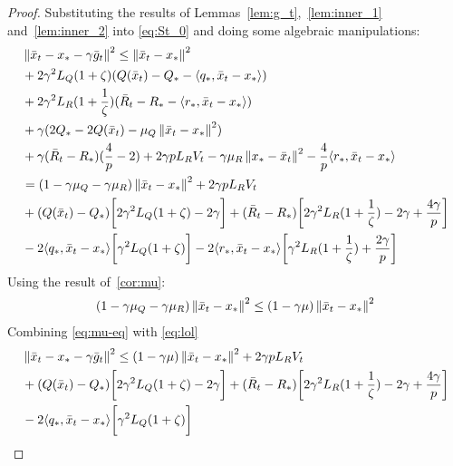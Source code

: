 \begin{proof} Substituting the results of Lemmas~\ref{lem:g_t},~\ref{lem:inner_1} and~\ref{lem:inner_2} into \eqref{eq:St_0} and doing some algebraic manipulations:
    \begin{align}
        \begin{split}
            &\left\|\bar{x}_t - x_* - \gamma \bar{g}_t\right\|^2 \leq \left\|\bar{x}_t - x_*\right\|^2 \\
            &+ 2\gamma^2 L_Q (1 + \zeta) (Q(\bar{x}_t) - Q_* - \langle q_*, \bar{x}_t - x_*\rangle) \\
            &+ 2\gamma^2 L_R (1 + \frac{1}{\zeta}) (\bar{R}_t - R_* - \langle r_*, \bar{x}_t - x_*\rangle) \\
            &+ \gamma ( 2 Q_* - 2 Q(\bar{x}_t) - \mu_Q \left\|\bar{x}_t - x_*\right\|^2 ) \\
            &+ \gamma(\bar{R}_t - R_*)(\frac{4}{p} - 2) + 2 \gamma p L_R V_t - \gamma \mu_R \left\|x_* - \bar{x}_t\right\|^2 - \frac{4}{p}\langle r_*, \bar{x}_t - x_*\rangle\\
            &= (1 - \gamma \mu_Q - \gamma \mu_R)\left\|\bar{x}_t - x_*\right\|^2 + 2 \gamma p L_R V_t \\
            &+ (Q(\bar{x}_t) - Q_*)\biggr[ 2\gamma^2 L_Q (1+\zeta) - 2\gamma \biggr]
            + (\bar{R}_t - R_*)\biggr[ 2\gamma^2 L_R (1+\frac{1}{\zeta}) - 2\gamma + \frac{4\gamma}{p} \biggr] \\
            &- 2\langle q_*, \bar{x}_t - x_*\rangle\biggr[ \gamma^2 L_Q(1+\zeta) \biggr]
            - 2\langle r_*, \bar{x}_t - x_*\rangle\biggr[ \gamma^2 L_R(1+\frac{1}{\zeta}) + \frac{2\gamma}{p} \biggr] \label{eq:lol}
        \end{split}
    \end{align}
    Using the result of~\ref{cor:mu}:
    \begin{align}
        (1 - \gamma \mu_Q - \gamma \mu_R)\left\|\bar{x}_t - x_*\right\|^2 \leq (1 - \gamma \mu)\left\|\bar{x}_t - x_*\right\|^2 \label{eq:mu-eq}
    \end{align}
    Combining \eqref{eq:mu-eq} with \eqref{eq:lol}
    \begin{align}
        \begin{split}
             &\norm{\bar{x}_t - x_* - \gamma \bar{g}_t}^2 \leq 
            (1 - \gamma \mu)\norm{\bar{x}_t - x_*}^2 + 2 \gamma p L_R V_t \\
            &+ (Q(\bar{x}_t) - Q_*)\coef {2\gamma^2 L_Q (1+\zeta) - 2\gamma}
            + (\bar{R}_t - R_*)\coef{2\gamma^2 L_R (1+\frac{1}{\zeta}) - 2\gamma + \frac{4\gamma}{p}} \\
            &- 2\inner{q_*}{\bar{x}_t - x_*}\coef{\gamma^2 L_Q(1+\zeta)}

\end{split}
\end{align}
\end{proof}
